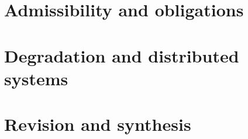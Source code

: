 \documentclass[11pt,twoside]{book}
\begin{document}








\part{Admissibility and obligations}









\part{Degradation and distributed systems}









\part{Revision and synthesis}









\appendix







\end{document}
